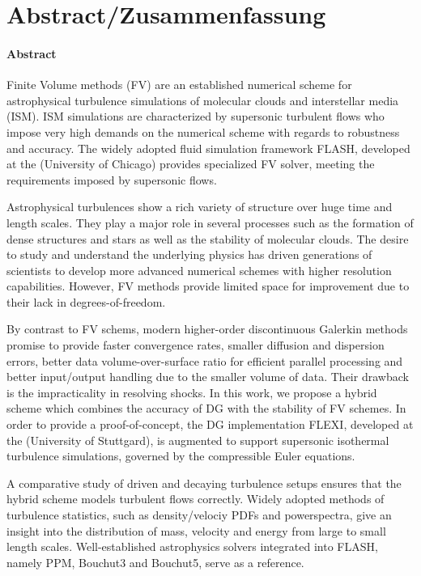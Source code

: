 \section*{Abstract/Zusammenfassung}
\paragraph{Abstract}
Finite Volume methods (FV) are an established numerical scheme for
astrophysical turbulence simulations of molecular clouds and interstellar media
(ISM). ISM simulations are characterized by supersonic turbulent flows who 
impose very high demands on the numerical scheme with regards to robustness and
accuracy. The widely adopted fluid simulation framework FLASH, developed at the
 (University of Chicago) provides
specialized FV solver, meeting the requirements imposed by supersonic flows.

Astrophysical turbulences show a rich variety of structure over huge time and
length scales. They play a major role in several processes such as the
formation of dense structures and stars as well as the stability of molecular
clouds. The desire to study and understand the underlying physics has driven
generations of scientists to develop more advanced numerical schemes with
higher resolution capabilities. However, FV methods provide limited space for
improvement due to their lack in degrees-of-freedom.

By contrast to FV schems, modern higher-order discontinuous Galerkin methods
promise to provide faster convergence rates, smaller diffusion and dispersion
errors, better data volume-over-surface ratio for efficient parallel processing
and better input/output handling due to the smaller volume of data. Their
drawback is the impracticality in resolving shocks. In this work, we propose a
hybrid scheme which combines the accuracy of DG with the stability of FV
schemes. In order to provide a proof-of-concept, the DG implementation FLEXI,
developed at the  (University
of Stuttgard), is augmented to support supersonic isothermal turbulence
simulations, governed by the compressible Euler equations.

A comparative study of driven and decaying turbulence setups ensures that the
hybrid scheme models turbulent flows correctly. Widely adopted methods of
turbulence statistics, such as density/velociy PDFs and powerspectra, give an
insight into the distribution of mass, velocity and energy from large to small
length scales. Well-established astrophysics solvers integrated into FLASH,
namely PPM, Bouchut3 and Bouchut5, serve as a reference.

